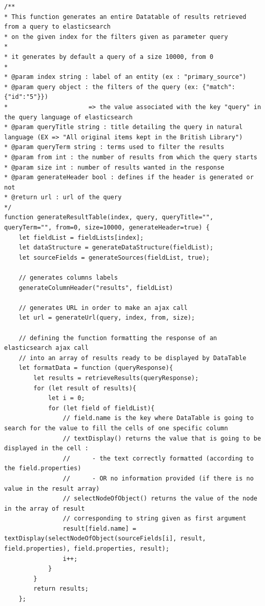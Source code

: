 \documentclass[a4paper,12pt,twoside]{book}
\begin{document}
\begin{lstlisting}
/**
* This function generates an entire Datatable of results retrieved from a query to elasticsearch
* on the given index for the filters given as parameter query
*
* it generates by default a query of a size 10000, from 0
*
* @param index string : label of an entity (ex : "primary_source")
* @param query object : the filters of the query (ex: {"match":{"id":"5"}})
*                      => the value associated with the key "query" in the query language of elasticsearch
* @param queryTitle string : title detailing the query in natural language (EX => "All original items kept in the British Library")
* @param queryTerm string : terms used to filter the results
* @param from int : the number of results from which the query starts
* @param size int : number of results wanted in the response
* @param generateHeader bool : defines if the header is generated or not
* @return url : url of the query
*/
function generateResultTable(index, query, queryTitle="", queryTerm="", from=0, size=10000, generateHeader=true) {
    let fieldList = fieldLists[index];
    let dataStructure = generateDataStructure(fieldList);
    let sourceFields = generateSources(fieldList, true);

    // generates columns labels
    generateColumnHeader("results", fieldList)

    // generates URL in order to make an ajax call
    let url = generateUrl(query, index, from, size);

    // defining the function formatting the response of an elasticsearch ajax call
    // into an array of results ready to be displayed by DataTable
    let formatData = function (queryResponse){
        let results = retrieveResults(queryResponse);
        for (let result of results){
            let i = 0;
            for (let field of fieldList){
                // field.name is the key where DataTable is going to search for the value to fill the cells of one specific column
                // textDisplay() returns the value that is going to be displayed in the cell :
                // 		- the text correctly formatted (according to the field.properties)
                // 		- OR no information provided (if there is no value in the result array)
                // selectNodeOfObject() returns the value of the node in the array of result
                // corresponding to string given as first argument
                result[field.name] = textDisplay(selectNodeOfObject(sourceFields[i], result, field.properties), field.properties, result);
                i++;
            }
        }
        return results;
    };


\end{lstlisting}
\end{document}

